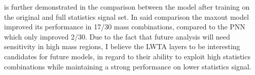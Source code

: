is further demonstrated in the comparison between the model after training on the original and full statistics signal set. In said comparison the maxout model improved its performance in 17/30 mass combinations, compared to the \ac{PNN} which only improved
2/30. Due to the fact that future analysis will need sensitivity in high mass regions, I believe the \ac{LWTA} layers to be interesting candidates for future models, in regard to their ability to exploit high statistics combinations while maintaining a 
strong performance on lower statistics signal. 

